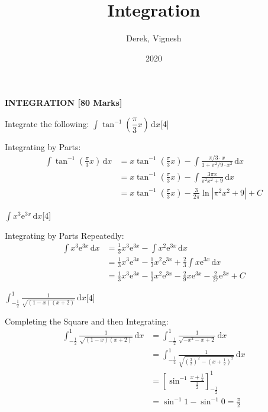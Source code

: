 \documentclass[12pt, a4 paper]{article}
\title{Integration}
\author{Derek, Vignesh}
\date{2020}
\begin{document}
\maketitle

\textbf{INTEGRATION [80 Marks]}
\begin{outline}[enumerate]
	\1 Integrate the following:
	\2 $\int \tan^{-1}(\dfrac{\pi}{3}x)\,\mathrm{d}x$\hfill[4]
	\begin{answer}
		Integrating by Parts:
		\begin{align*}
			\int \tan^{-1}(\frac{\pi}{3}x)\,\mathrm{d}x
			  & = x\tan^{-1}(\frac{\pi}{3}x)-\int\frac{\pi/3\cdot x}{1+\pi^2/9\cdot x^2}\,\mathrm{d}x \\&= x\tan^{-1}(\frac{\pi}{3}x)-\int \frac{3\pi x}{\pi^2x^2+9}\,\mathrm{d}x \\
			  & = x\tan^{-1}(\frac{\pi}{3}x) - \frac{3}{2\pi}\ln{|\pi^2x^2+9|} + C
		\end{align*}
	\end{answer}
	\2 $\int x^3\mathrm{e}^{3x} \,\mathrm{d}x$\hfill[4]
	\begin{answer}
		Integrating by Parts Repeatedly:
		\begin{align*}
			\int x^3\mathrm{e}^{3x} \,\mathrm{d}x & = \frac{1}{3}x^3\mathrm{e}^{3x}-\int x^2\mathrm{e}^{3x}\,\mathrm{d}x                                                          \\&=\frac{1}{3}x^3\mathrm{e}^{3x} - \frac{1}{3}x^2\mathrm{e}^{3x}+\frac{2}{3}\int x\mathrm{e}^{3x}\,\mathrm{d}x \\
			                                      & = \frac{1}{3}x^3\mathrm{e}^{3x} - \frac{1}{3}x^2\mathrm{e}^{3x} - \frac{2}{9}x\mathrm{e}^{3x} - \frac{2}{27}\mathrm{e}^{3x}+C
		\end{align*}
	\end{answer}
	\2 $\int_{-\frac{1}{2}}^1 \frac{1}{\sqrt{(1-x)(x+2)}}\,\mathrm{d}x$\hfill[4]
	\begin{answer}
		Completing the Square and then Integrating:
		\begin{align*}
			\int_{-\frac{1}{2}}^1 \frac{1}{\sqrt{(1-x)(x+2)}}\,\mathrm{d}x & = \int_{-\frac{1}{2}}^1 \frac{1}{\sqrt{-x^2-x+2}}\,\mathrm{d}x    \\&= \int_{-\frac{1}{2}}^1 \frac{1}{\sqrt{(\frac{3}{2})^2-(x+\frac{1}{2})^2}}\,\mathrm{d}x \\
			                                                               & = [\sin^{-1}{\frac{x+\frac{1}{2}}{\frac{3}{2}}}]_{-\frac{1}{2}}^1 \\
			                                                               & = \sin^{-1}1-\sin^{-1}0 = \frac{\pi}{2}

\end{align*}
\end{answer}
\end{outline}
\end{document}
